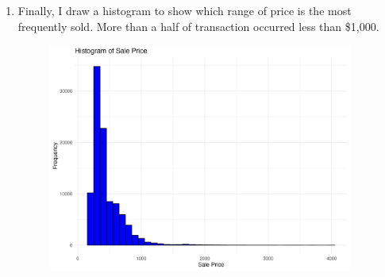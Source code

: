 \documentclass{article}
\begin{document}
\begin{large}
\begin{enumerate}
\begin{figure}[h]
	\end{figure}
	\item Finally, I draw a histogram to show which range of price is the most frequently sold. More than a half of transaction occurred less than \$1,000.
	\begin{figure}[h]
		\centering
		\includegraphics[width = 100mm]{PS6c_Oh.png}
	\end{figure}
\end{enumerate}




	
\end{large}
\end{document}
